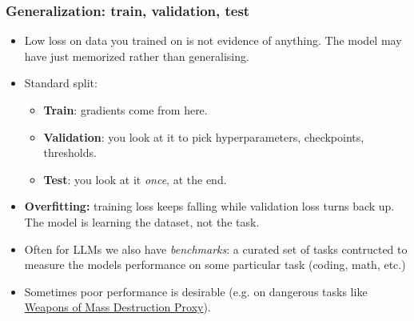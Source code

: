 \begin{frame}
\frametitle{Generalization: train, validation, test}
\begin{itemize}
    \item Low loss on data you trained on is not evidence of anything. The model
    may have just memorized rather than generalising. 
    \pause
    \item Standard split:
    \begin{itemize}
        \item \textbf{Train}: gradients come from here.
        \item \textbf{Validation}: you look at it to pick hyperparameters,
        checkpoints, thresholds.
        \item \textbf{Test}: you look at it \textit{once}, at the end.
    \end{itemize}
    \pause
    \item \textbf{Overfitting:} training loss keeps falling while validation
    loss turns back up. The model is learning the dataset, not the task.
    \pause
    \item Often for LLMs we also have \emph{benchmarks}: a curated set of tasks
    contructed to measure the models performance on some particular task (coding,
    math, etc.)
    \pause
    \item Sometimes poor performance is desirable (e.g. on dangerous tasks like 
    \href{https://www.wmdp.ai/}{Weapons of Mass Destruction Proxy}).
\end{itemize}
\end{frame}

